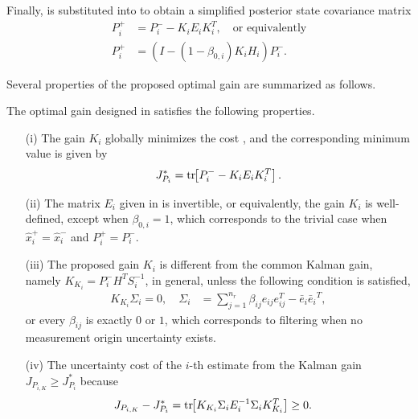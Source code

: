 Finally,  is substituted into  to obtain a simplified posterior state covariance matrix
\begin{align}
P^+_{i}&=P^-_{i}-K_iE_iK_i^T, \quad \mbox{or equivalently}\label{eqn:JPDAFPostCovSymmetricUpdate}
\\
P^+_{i}&=\left(I-(1-\beta_{0,i})K_iH_i\right)P^-_i.\label{eqn:JPDAFPostCovSimpleUpdate}
\end{align}

Several properties of the proposed optimal gain are summarized as follows.
\begin{prop}
The optimal gain designed in  satisfies the following properties.
\begin{itemize}
\item[(i)] The gain $K_i$ globally minimizes the cost , and the corresponding minimum value is given by
\begin{align*}
J^*_{P_i} = \mathrm{tr}\negthickspace\left[ P^-_{i}-K_iE_iK_i^T \right].
\end{align*}
\item[(ii)] The matrix $E_i$ given in  is invertible, or equivalently, the gain $K_i$ is well-defined, except when $\beta_{0,i}=1$, which corresponds to the trivial case when $\hat x_i^+=\hat x_i^-$ and $P_i^+=P_i^-$.
\item[(iii)] The proposed gain $K_i$ is different from the common Kalman gain, namely $K_{K_i}=P_{i}^{-}H^T S_i^{-1}$, in general, unless the following condition is satisfied,
\begin{align*}
K_{K_i}\Sigma_i=0, \quad \Sigma_i&={\sum_{j=1}^{n_r} \beta_{ij}e_{ij}e_{ij}^T-{\bar{e}_i}}{\bar{e}_i}^T,
\end{align*}
or every $\beta_{ij}$ is exactly $0$ or $1$, which corresponds to filtering when no measurement origin uncertainty exists.
\item[(iv)] The uncertainty cost of the $i$-th estimate from the Kalman gain $J_{P_{i,K}}\geq J^*_{P_i}$ because
\begin{align*}
J_{P_{i,K}}-J^*_{P_i}&=\mathrm{tr}\negthickspace\left[ K_{K_i}\Sigma_i E_i^{-1}\Sigma_i K_{K_i}^T \right]\geq0.
\end{align*}
\end{itemize}
\end{prop}
